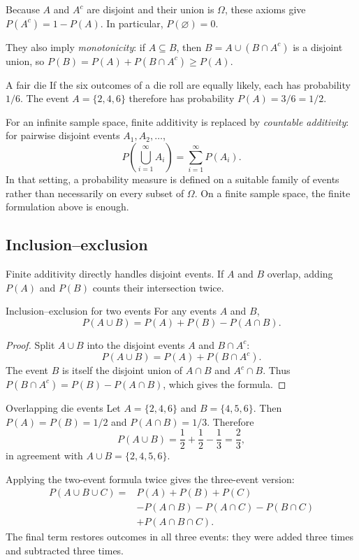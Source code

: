 \documentclass[a4paper,12pt,oneside]{report}
\begin{document}
Because $A$ and $A^c$ are disjoint and their union is $\Omega$,
these axioms give $P(A^c)=1-P(A)$. In particular,
$P(\varnothing)=0$. 

They also imply \emph{monotonicity}: if
$A\subseteq B$, then $B=A\cup(B\cap A^c)$ is a disjoint union,
so $P(B)=P(A)+P(B\cap A^c)\geq P(A)$.

\begin{framedexample}{A fair die}
If the six outcomes of a die roll are equally likely, each has
probability $1/6$. The event $A=\{2,4,6\}$ therefore has probability
$P(A)=3/6=1/2$.
\end{framedexample}

For an infinite sample space, finite additivity is replaced by
\emph{countable additivity}: for pairwise disjoint events
$A_1,A_2,\ldots$,
\[
  P\!\left(\bigcup_{i=1}^{\infty}A_i\right)
    =\sum_{i=1}^{\infty}P(A_i).
\]
In that setting, a probability measure is defined on a suitable
family of events rather than necessarily on every subset of
$\Omega$. On a finite sample space, the finite formulation above is
enough.

\subsection{Inclusion--exclusion}

Finite additivity directly handles disjoint events. If $A$ and $B$
overlap, adding $P(A)$ and $P(B)$ counts their intersection twice.

\begin{framedprop}{Inclusion--exclusion for two events}
For any events $A$ and $B$,
\[
  P(A\cup B)=P(A)+P(B)-P(A\cap B).
\]
\end{framedprop}

\begin{proof}
Split $A\cup B$ into the disjoint events $A$ and $B\cap A^c$:
\[
  P(A\cup B)=P(A)+P(B\cap A^c).
\]
The event $B$ is itself the disjoint union of $A\cap B$ and
$A^c\cap B$. Thus
$P(B\cap A^c)=P(B)-P(A\cap B)$, which gives the formula.
\end{proof}

\begin{framedexample}{Overlapping die events}
Let $A=\{2,4,6\}$ and $B=\{4,5,6\}$. Then
$P(A)=P(B)=1/2$ and $P(A\cap B)=1/3$. Therefore
\[
  P(A\cup B)=\frac12+\frac12-\frac13=\frac23,
\]
in agreement with $A\cup B=\{2,4,5,6\}$.
\end{framedexample}

Applying the two-event formula twice gives the three-event version:
\[
\begin{aligned}
P(A\cup B\cup C)
  ={}&P(A)+P(B)+P(C)\\
    &-P(A\cap B)-P(A\cap C)-P(B\cap C)\\
    &+P(A\cap B\cap C).
\end{aligned}
\]
The final term restores outcomes in all three events: they were
added three times and subtracted three times.
\end{document}
